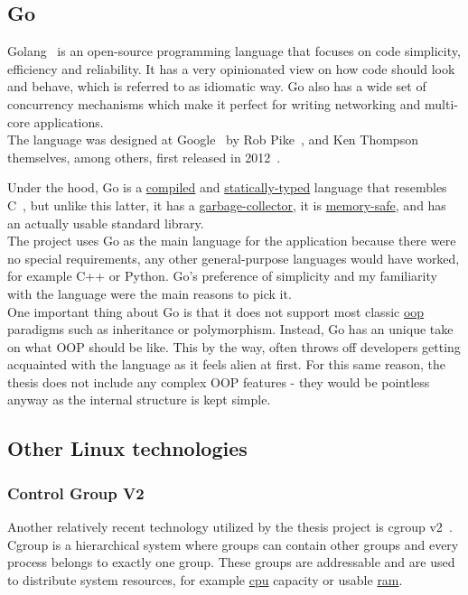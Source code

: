 \newpage
\subsection{Go}
Golang~\cite{go} is an open-source programming language that focuses on code simplicity, efficiency and reliability. It has a very opinionated view on how code should look and behave, which is referred to as idiomatic way. Go also has a wide set of concurrency mechanisms which make it perfect for writing networking and multi-core applications. \\

The language was designed at Google~\cite{google} by Rob Pike~\cite{rpike}, and Ken Thompson~\cite{kthompson} themselves, among others, first released in 2012~\cite{go-1}.

Under the hood, Go is a \underline{\gls{compiled}} and \underline{\gls{statically-typed}} language that resembles C~\cite{c}, but unlike this latter, it has a \underline{\gls{garbage-collector}}, it is \underline{\gls{memory-safe}}, and has an actually usable standard library. \\

The project uses Go as the main language for the application because there were no special requirements, any other general-purpose languages would have worked, for example C++ or Python. Go's preference of simplicity and my familiarity with the language were the main reasons to pick it. \\

One important thing about Go is that it does not support most classic \underline{\gls{oop}} paradigms such as inheritance or polymorphism. Instead, Go has an unique take on what OOP should be like. This by the way, often throws off developers getting acquainted with the language as it feels alien at first. For this same reason, the thesis does not include any complex OOP features - they would be pointless anyway as the internal structure is kept simple.

\newpage
\subsection{Other Linux technologies}
\subsubsection{Control Group V2}
Another relatively recent technology utilized by the thesis project is cgroup v2~\cite{cgroup}. Cgroup is a hierarchical system where groups can contain other groups and every process belongs to exactly one group. These groups are addressable and are used to distribute system resources, for example \underline{\gls{cpu}} capacity or usable \underline{\gls{ram}}. \\

